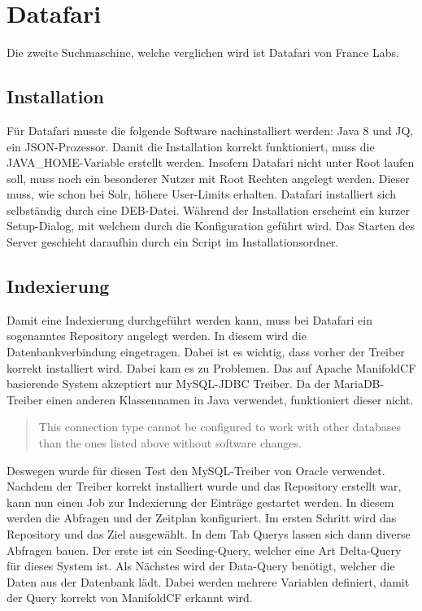 
\section{Datafari}

Die zweite Suchmaschine, welche verglichen wird ist Datafari von France Labs.

\subsection{Installation}

Für Datafari musste die folgende Software nachinstalliert werden: Java 8 und JQ, ein JSON-Prozessor. Damit die Installation korrekt funktioniert, muss die JAVA\_HOME-Variable erstellt werden. Insofern Datafari nicht unter Root laufen soll, muss noch ein besonderer Nutzer mit Root Rechten angelegt werden. Dieser muss, wie schon bei Solr, höhere User-Limits erhalten. Datafari installiert sich selbständig durch eine DEB-Datei. Während der Installation erscheint ein kurzer Setup-Dialog, mit welchem durch die Konfiguration geführt wird. Das Starten des Server geschieht daraufhin durch ein Script im Installationsordner.

\subsection{Indexierung}

Damit eine Indexierung durchgeführt werden kann, muss bei Datafari ein sogenanntes Repository angelegt werden. In diesem wird die Datenbankverbindung eingetragen. Dabei ist es wichtig, dass vorher der Treiber korrekt installiert wird. Dabei kam es zu Problemen.
Das auf Apache ManifoldCF basierende System akzeptiert nur MySQL-JDBC Treiber. Da der MariaDB-Treiber einen anderen Klassennamen in Java verwendet, funktioniert dieser nicht. \begin{quote} This connection type cannot be configured to work with other databases than the ones listed above without software changes.~\cite[S.~61]{ApacheSoftwareFoundation.}\end{quote} Deswegen wurde für diesen Test den MySQL-Treiber von Oracle verwendet.
Nachdem der Treiber korrekt installiert wurde und das Repository erstellt war, kann nun einen Job zur Indexierung der Einträge gestartet werden. In diesem werden die Abfragen und der Zeitplan konfiguriert.
Im ersten Schritt wird das Repository und das Ziel ausgewählt. In dem Tab Querys lassen sich dann diverse Abfragen bauen. Der erste ist ein Seeding-Query, welcher eine Art Delta-Query für dieses System ist. Als Nächstes wird der Data-Query benötigt, welcher die Daten aus der Datenbank lädt. Dabei werden mehrere Variablen definiert, damit der Query korrekt von ManifoldCF erkannt wird. 

